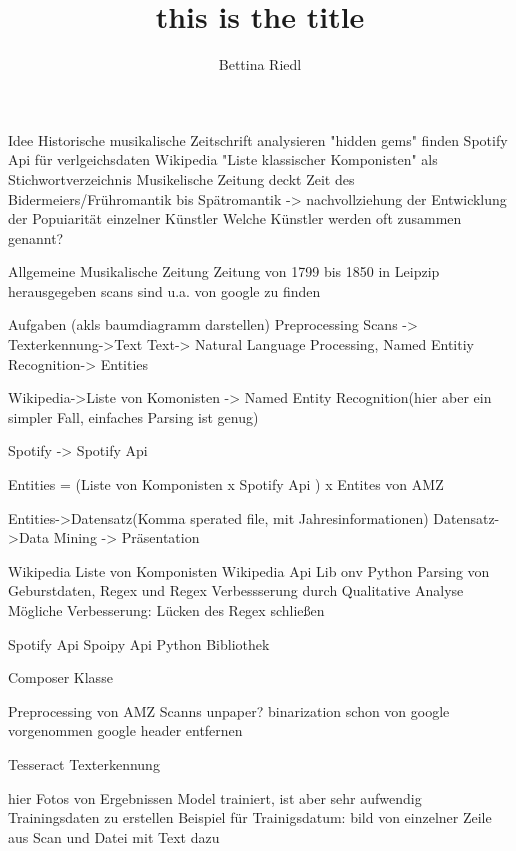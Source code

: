 \documentclass{beamer}
\title{this is the title}
\author{Bettina Riedl}
\begin{document}
\begin{frame}[plain]
    \maketitle
\end{frame}
\begin{frame}{Idee}
	Historische musikalische Zeitschrift analysieren
	"hidden gems" finden
	Spotify Api für verlgeichsdaten
	Wikipedia "Liste klassischer Komponisten" als Stichwortverzeichnis
	Musikelische Zeitung deckt Zeit des Bidermeiers/Frühromantik bis Spätromantik -> nachvollziehung der Entwicklung der Popuiarität einzelner Künstler
	Welche Künstler werden oft zusammen genannt?
\end{frame}
\begin{frame}{Allgemeine Musikalische Zeitung}
	Zeitung von 1799 bis 1850 in Leipzip herausgegeben 
	scans sind u.a. von google zu finden
\end{frame}
\begin{frame}{Aufgaben}
	(akls baumdiagramm darstellen)
	Preprocessing
	Scans -> Texterkennung->Text
	Text->  Natural Language Processing, Named Entitiy Recognition-> Entities
	
	Wikipedia->Liste von Komonisten -> Named Entity Recognition(hier aber ein simpler Fall, einfaches Parsing ist genug)
	
	Spotify -> Spotify Api
	
	Entities = (Liste von Komponisten x Spotify Api ) x Entites von AMZ

	Entities->Datensatz(Komma sperated file, mit Jahresinformationen)
	Datensatz->Data Mining -> Präsentation
\end{frame}
\begin{frame}{Wikipedia Liste von Komponisten}
	Wikipedia Api Lib onv Python
	Parsing von Geburstdaten, Regex und Regex Verbessserung durch Qualitative Analyse
	Mögliche Verbesserung: Lücken des Regex schließen
\end{frame}
\begin{frame}{Spotify Api}
	Spoipy Api Python Bibliothek 
\end{frame}
\begin{frame}{Composer Klasse}
	
\end{frame}
\begin{frame}{Preprocessing von AMZ Scanns}
	unpaper? binarization schon von google vorgenommen
	google header entfernen
\end{frame}
\begin{frame}{Tesseract}
Texterkennung

hier Fotos von Ergebnissen
Model trainiert, ist aber sehr aufwendig Trainingsdaten zu erstellen
Beispiel für Trainigsdatum: bild von einzelner Zeile aus Scan und Datei mit Text dazu
\end{frame}
\end{document}
